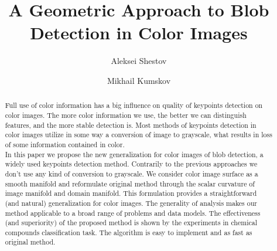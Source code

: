 \documentclass{llncs}
\begin{document}
\title{A Geometric Approach to Blob Detection in Color Images}
%

\author{Aleksei Shestov \and Mikhail Kumskov} 
%



\maketitle              %

\begin{abstract}
%
Full use of color information has a big influence on quality of keypoints detection on color images. The more color information we use, the better we can distinguish features, and the more stable detection is. Most methods of keypoints detection in color images utilize in some way a conversion of image to grayscale, what results in loss of some information contained in color. \\

In this paper we propose the new generalization for color images of blob detection, a widely used keypoints detection method. Contrarily to the previous approaches we don’t use any kind of conversion to grayscale. We consider color image surface as a smooth manifold and reformulate original method through the scalar curvature of image manifold and domain manifold. This formulation provides a straightforward (and natural) generalization for color images. The generality of analysis makes our method applicable to a broad range of problems and data models. The effectiveness (and superiority) of the proposed method is shown by the experiments in chemical compounds classification task. The algorithm is easy to implement and as fast as original method. 
 \end{abstract}  
%
\end{document}
